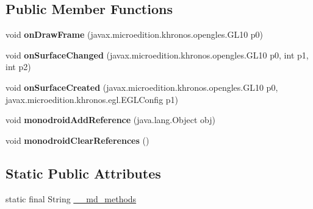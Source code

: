 \subsection*{Public Member Functions}
\begin{DoxyCompactItemize}
\item 
\mbox{\label{classmd5b60ffeb829f638581ab2bb9b1a7f4f3f_1_1OpenGLViewRenderer__Renderer_a13437d07738622115709479669ef46a0}} 
void {\bfseries on\+Draw\+Frame} (javax.\+microedition.\+khronos.\+opengles.\+G\+L10 p0)
\item 
\mbox{\label{classmd5b60ffeb829f638581ab2bb9b1a7f4f3f_1_1OpenGLViewRenderer__Renderer_a6ec5c9b9fc4c374d02ce3788d6ad6a64}} 
void {\bfseries on\+Surface\+Changed} (javax.\+microedition.\+khronos.\+opengles.\+G\+L10 p0, int p1, int p2)
\item 
\mbox{\label{classmd5b60ffeb829f638581ab2bb9b1a7f4f3f_1_1OpenGLViewRenderer__Renderer_a7232536fa62d31b5e230568c18189110}} 
void {\bfseries on\+Surface\+Created} (javax.\+microedition.\+khronos.\+opengles.\+G\+L10 p0, javax.\+microedition.\+khronos.\+egl.\+E\+G\+L\+Config p1)
\item 
\mbox{\label{classmd5b60ffeb829f638581ab2bb9b1a7f4f3f_1_1OpenGLViewRenderer__Renderer_abd5994165886f576dadade7f97fa0317}} 
void {\bfseries monodroid\+Add\+Reference} (java.\+lang.\+Object obj)
\item 
\mbox{\label{classmd5b60ffeb829f638581ab2bb9b1a7f4f3f_1_1OpenGLViewRenderer__Renderer_ac2a1d806a5c6a2de5728d94cd3894aa8}} 
void {\bfseries monodroid\+Clear\+References} ()
\end{DoxyCompactItemize}
\subsection*{Static Public Attributes}
\begin{DoxyCompactItemize}
\item 
static final String \hyperlink{classmd5b60ffeb829f638581ab2bb9b1a7f4f3f_1_1OpenGLViewRenderer__Renderer_a571e71003f6b143de8e407be41c7b3d3}{\+\_\+\+\_\+md\+\_\+methods}
\end{DoxyCompactItemize}
